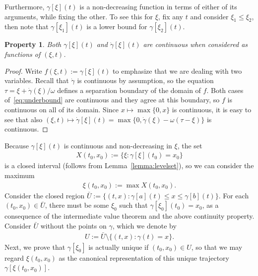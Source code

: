 \documentclass[a4paper]{article}
\theoremstyle{definition}
\theoremstyle{plain}
\newtheorem{property}{Property\hspace{0.25em}\ignorespaces}
\begin{document}
Furthermore, $\gamma[\xi](t)$ is a non-decreasing function in terms of either of its
arguments, while fixing the other. To see this for $\xi$, fix any $t$ and
consider $\xi_{1} \leq \xi_{2}$, then note that $\gamma[\xi_{1}](t)$ is a lower
bound for $\gamma[\xi_{2}](t)$.
%
\begin{property}
  Both $\gamma[\xi](t)$ and $\dot{\gamma}[\xi](t)$ are continuous when considered as functions
  of $(\xi, t)$.
\end{property}
\begin{proof}
  Write $f(\xi, t) := \gamma[\xi](t)$ to emphasize that we are dealing with two variables.
  Recall that $\dot{\gamma}$ is continuous by assumption, so the equation
  $\tau = \xi + \dot{\gamma}(\xi)/\omega$ defines a separation boundary of the
  domain of $f$. Both cases of~\eqref{eq:underbound} are continuous and they
  agree at this boundary, so $f$ is continuous on all of its domain.
  Since $x \mapsto \max\{0, x \}$ is continuous, it is easy to see that also
  $(\xi, t) \mapsto \dot{\gamma}[\xi](t) = \max\{0, \dot{\gamma}(\xi) - \omega (\tau - \xi) \}$
  is continuous.
\end{proof}

Because $\gamma[\xi](t)$ is continuous and non-decreasing in $\xi$, the set
\begin{align}\label{eq:X}
  X(t_{0}, x_{0}) := \{\xi : \gamma[\xi](t_{0}) = x_{0}\}
\end{align}
is a closed interval (follows from Lemma~\ref{lemma:levelset}), so we can consider the maximum
\begin{align}\label{eq:xi}
  \xi(t_{0}, x_{0}) := \max X(t_{0}, x_{0}) .
\end{align}
%
Consider the closed region $\bar{U} := \{ (t, x) : \gamma[a](t) \leq x \leq \gamma[b](t) \}$.
For each $(t_{0}, x_{0}) \in \bar{U}$, there must be some $\xi_{0}$ such that
$\gamma[\xi_{0}](t_{0}) = x_{0}$, as a consequence of the intermediate value theorem and the
above continuity property.
%
Consider $\bar{U}$ without the points on $\gamma$, which we denote by
\begin{align}\label{eq:U}
  U := \bar{U} \setminus \{ (t,x) : \gamma(t) = x\}.
\end{align}
Next, we prove that $\gamma[\xi_{0}]$ is actually unique if $(t_{0}, x_{0}) \in U$, so that we
may regard $\xi(t_{0}, x_{0})$ as the canonical representation of this unique
trajectory $\gamma[\xi(t_{0}, x_{0})]$.
\end{document}
